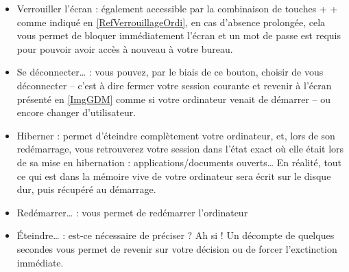 \begin{itemize}
\item Verrouiller l'écran : également accessible par la combinaison de touches  +  +  comme indiqué en \ref{RefVerrouillageOrdi}, en cas d'absence prolongée, cela vous permet de bloquer immédiatement l'écran et un mot de passe est requis pour pouvoir avoir accès à nouveau à votre bureau.
\item Se déconnecter\ldots{} : vous pouvez, par le biais de ce bouton, choisir de vous déconnecter -- c'est à dire fermer votre session courante et revenir à l'écran présenté en \ref{ImgGDM} comme si votre ordinateur venait de démarrer -- ou encore changer d'utilisateur.
\item Hiberner : permet d'éteindre complètement votre ordinateur, et, lors de son redémarrage, vous retrouverez votre session dans l'état exact où elle était lors de sa mise en hibernation : applications/documents ouverts\ldots{} En réalité, tout ce qui est dans la mémoire vive de votre ordinateur sera écrit sur le disque dur, puis récupéré au démarrage.
\item Redémarrer\ldots{} : vous permet de redémarrer l'ordinateur
\item Éteindre\ldots{} : est-ce nécessaire de préciser ? Ah si ! Un décompte de quelques secondes vous permet de revenir sur votre décision ou de forcer l'exctinction immédiate.
\end{itemize}
\SessionIndicator
